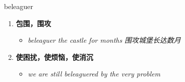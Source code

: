
\begin{frame}
{\huge beleaguer}
\begin{center}
\begin{enumerate}\Large
  \item \textbf{包围，围攻}
  \begin{itemize}
    \item \em{\Large{beleaguer the castle for months 围攻城堡长达数月}}
  \end{itemize}
  \item \textbf{使困扰，使烦恼，使消沉}
  \begin{itemize}
    \item \em{\Large{we are still beleaguered by the very problem}}
  \end{itemize}
\end{enumerate}
\end{center}
\end{frame}
